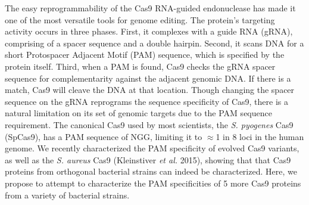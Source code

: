 
The easy reprogrammability of the Cas9 RNA-guided endonuclease has made it one of the most versatile tools for genome editing. The protein's targeting activity occurs in three phases. First, it complexes with a guide RNA (gRNA), comprising of a spacer sequence and a double hairpin. Second, it scans DNA for a short Protospacer Adjacent Motif (PAM) sequence, which is specified by the protein itself. Third, when a PAM is found, Cas9 checks the gRNA spacer sequence for complementarity against the adjacent genomic DNA. If there is a match, Cas9 will cleave the DNA at that location. Though changing the spacer sequence on the gRNA reprograms the sequence specificity of Cas9, there is a 
natural limitation on its set of genomic targets due to the PAM sequence requirement. The canonical Cas9 used by most scientists, the \textit{S. pyogenes} Cas9 (SpCas9), has a PAM sequence of NGG, limiting it to $\approx$1 in 8 loci in the human genome. We recently characterized the PAM specificity of evolved Cas9 variants, as well as the \textit{S. aureus} Cas9 (Kleinstiver \textit{et al.} 2015), showing that that Cas9 proteins from orthogonal bacterial strains can indeed be characterized. Here, we propose to attempt to characterize the PAM specificities of 5 more Cas9 proteins from a variety of bacterial strains.
